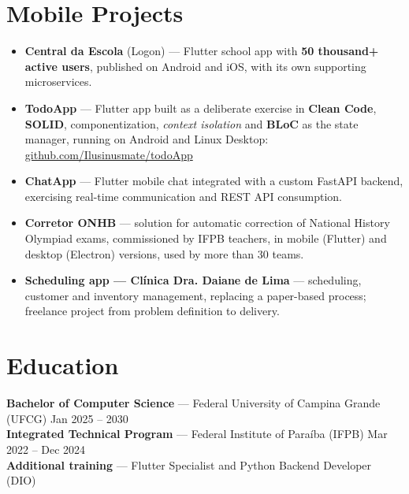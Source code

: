 \documentclass[10.5pt,a4paper]{article}
\begin{document}
\section*{Mobile Projects}
\begin{itemize}
  \item \textbf{Central da Escola} (Logon) --- Flutter school app with \textbf{50 thousand+ active
        users}, published on Android and iOS, with its own supporting microservices.
  \item \textbf{TodoApp} --- Flutter app built as a deliberate exercise in \textbf{Clean Code},
        \textbf{SOLID}, componentization, \textit{context isolation} and \textbf{BLoC} as the state
        manager, running on Android and Linux Desktop:
        \href{https://github.com/Ilusinusmate/todoApp}{github.com/Ilusinusmate/todoApp}
  \item \textbf{ChatApp} --- Flutter mobile chat integrated with a custom FastAPI backend, exercising
        real-time communication and REST API consumption.
  \item \textbf{Corretor ONHB} --- solution for automatic correction of National History Olympiad
        exams, commissioned by IFPB teachers, in mobile (Flutter) and desktop (Electron) versions,
        used by more than 30 teams.
  \item \textbf{Scheduling app --- Clínica Dra. Daiane de Lima} --- scheduling, customer and
        inventory management, replacing a paper-based process; freelance project from problem
        definition to delivery.
\end{itemize}

\section*{Education}
\textbf{Bachelor of Computer Science} --- Federal University of Campina Grande (UFCG)
\hfill Jan 2025 -- 2030\\
\textbf{Integrated Technical Program} --- Federal Institute of Paraíba (IFPB)
\hfill Mar 2022 -- Dec 2024\\
\textbf{Additional training} --- Flutter Specialist and Python Backend Developer (DIO)

\end{document}
